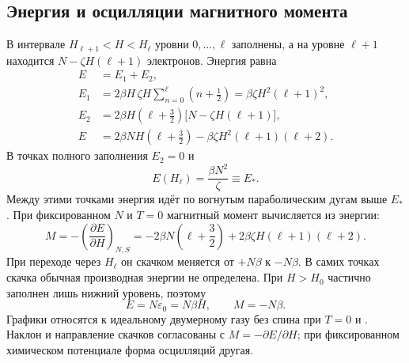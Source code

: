 \documentclass[../final.tex]{subfiles}
\begin{document}
\subsection{Энергия и осцилляции магнитного момента}
В интервале $H_{\ell+1}<H<H_\ell$ уровни $0,\ldots,\ell$ заполнены,
а на уровне $\ell+1$ находится $N-\zeta H(\ell+1)$ электронов. Энергия равна
\begin{align*}
 E&=E_1+E_2,\\
 E_1&=2\beta H\,\zeta H\sum_{n=0}^{\ell}\left(n+\frac12\right)
 =\beta\zeta H^2(\ell+1)^2,\\
 E_2&=2\beta H\left(\ell+\frac32\right)
 \bigl[N-\zeta H(\ell+1)\bigr],\\
 E&=2\beta NH\left(\ell+\frac32\right)
 -\beta\zeta H^2(\ell+1)(\ell+2).
\end{align*}
В точках полного заполнения $E_2=0$ и
\begin{equation*}
 E(H_\ell)=\frac{\beta N^2}{\zeta}\equiv E_*.
\end{equation*}
Между этими точками энергия идёт по вогнутым параболическим дугам выше $E_*$.
При фиксированном $N$ и $T=0$ магнитный момент вычисляется из энергии:
\begin{equation*}
 M=-\left(\frac{\partial E}{\partial H}\right)_{N,S}
 =-2\beta N\left(\ell+\frac32\right)
 +2\beta\zeta H(\ell+1)(\ell+2).
\end{equation*}
При переходе через $H_\ell$ он скачком меняется от $+N\beta$ к $-N\beta$.
В самих точках скачка обычная производная энергии не определена.
При $H>H_0$ частично заполнен лишь нижний уровень, поэтому
\begin{equation*}
 E=N\varepsilon_0=N\beta H,\qquad M=-N\beta.
\end{equation*}
Графики относятся к идеальному двумерному газу без спина при
$T=0$ и .
Наклон и направление скачков согласованы с $M=-\partial E/\partial H$;
при фиксированном химическом потенциале форма осцилляций другая.
\end{document}
